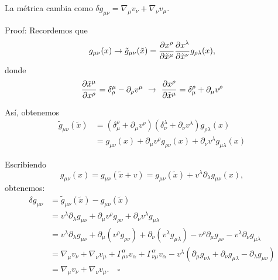 \documentclass[../main]{subfiles}
\begin{document}
\proposicion{} La métrica cambia como $\delta g_{\mu\nu}=\nabla_{\mu} v_{\nu}+\nabla_{\nu} v_{\mu}$.

Proof: Recordemos que 
\begin{equation}
    g_{\mu\nu}(x) \rightarrow \tilde{g}_{\mu\nu}(\tilde{x}) = \pdv{x^{\rho}}{\tilde{x}^{\mu}} \pdv{x^{\lambda}}{\tilde{x}^{\nu}}g_{\rho\lambda}(x),
\end{equation}
donde 
\begin{equation}
    \pdv{\tilde{x}^{\mu}}{x^{\rho}}=\delta^{\mu}_{\rho}-\partial_{\rho} v^{\mu} \ \rightarrow \ \pdv{x^{\rho}}{\tilde{x}^{\mu}}=\delta^{\rho}_{\mu}+\partial_{\mu}v^{\rho}
\end{equation}

Así, obtenemos 
\begin{equation}
    \begin{split}
        \tilde{g}_{\mu\nu}(\tilde{x})&=\left(\delta^{\rho}_{\mu}+\partial_{\mu}v^{\rho}\right)\left(\delta^{\lambda}_{\nu}+\partial_{\nu}v^{\lambda}\right)g_{\rho\lambda}(x)\\
        &=g_{\mu\nu}(x)+\partial_{\mu}v^{\rho}g_{\rho\nu}(x)+\partial_{\nu}v^{\lambda}g_{\mu\lambda}(x)
    \end{split}
\end{equation}

Escribiendo 
\begin{equation}
    g_{\mu\nu}(x)=g_{\mu\nu}(\tilde{x}+v)=g_{\mu\nu}(\tilde{x})+v^{\lambda}\partial_{\lambda} g_{\mu\nu}(x),
\end{equation}
obtenemos:
\begin{equation}
    \begin{split}
        \delta g_{\mu\nu}&=\tilde{g}_{\mu\nu}(\tilde{x})-g_{\mu\nu}(\tilde{x})\\
        &=v^{\lambda}\partial_{\lambda} g_{\mu\nu}+\partial_{\mu}v^{\rho}g_{\rho\nu}+\partial_{\nu}v^{\lambda}g_{\mu\lambda}\\
        &=v^{\lambda}\partial_{\lambda} g_{\mu\nu}+\partial_{\mu}(v^{\rho}g_{\rho\nu})+\partial_{\nu}(v^{\lambda}g_{\mu\lambda})-v^{\rho}\partial_{\mu} g_{\rho\nu}-v^{\lambda} \partial_{\nu}g_{\mu\lambda}\\
        &=\nabla_{\mu} v_{\nu}+\nabla_{\nu}v_{\mu}+\Gamma^{\alpha}_{\mu\nu}v_{\alpha}+\Gamma^{\alpha}_{\nu\mu}v_{\alpha}-v^{\lambda}(\partial_{\mu}g_{\nu\lambda}+\partial_{\nu}g_{\mu\lambda}-\partial_{\lambda}g_{\mu\nu})\\
        &=\nabla_{\mu} v_{\nu}+\nabla_{\nu}v_{\mu}. \quad \square 
    \end{split}
\end{equation}
\end{document}
